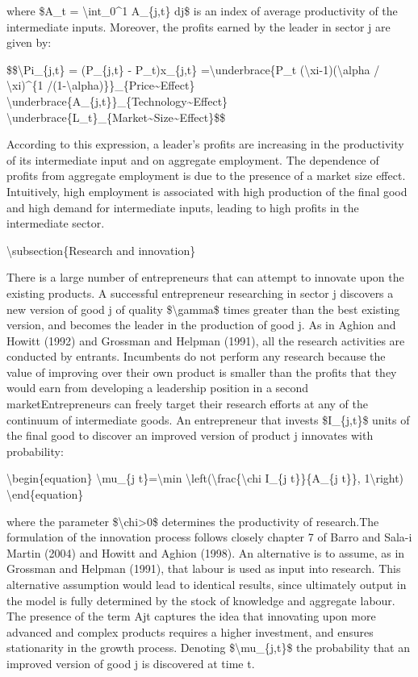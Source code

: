 \documentclass[10pt,math=newtx,citestyle=gb7714-2015,bibstyle=gb7714-2015]{elegantbook}
\begin{document}
	where \$A\_t = \textbackslash{}int\_0\^{}1 A\_\{j,t\} dj\$ is an index of average productivity of the intermediate inputs. Moreover, the profits earned by the leader in sector j are given by:
	
	\$\$\textbackslash{}Pi\_\{j,t\} = (P\_\{j,t\} - P\_t)x\_\{j,t\} =\textbackslash{}underbrace\{P\_t (\textbackslash{}xi-1)(\textbackslash{}alpha / \textbackslash{}xi)\^{}\{1 /(1-\textbackslash{}alpha)\}\}\_\{Price\~{}Effect\} \textbackslash{}underbrace\{A\_\{j,t\}\}\_\{Technology\~{}Effect\} \textbackslash{}underbrace\{L\_t\}\_\{Market\~{}Size\~{}Effect\}\$\$
	
	According to this expression, a leader’s profits are increasing in the productivity of its intermediate input and on aggregate employment. The dependence of profits from aggregate employment is due to the presence of a market size effect. Intuitively, high employment is associated with high production of the final good and high demand for intermediate inputs, leading to high profits in the intermediate sector.
	
	\textbackslash{}subsection\{Research and innovation\}
	
	There is a large number of entrepreneurs that can attempt to innovate upon the existing products. A successful entrepreneur researching in sector j discovers a new version of good j of quality \$\textbackslash{}gamma\$ times greater than the best existing version, and becomes the leader in the production of good j. As in Aghion and Howitt (1992) and Grossman and Helpman (1991), all the research activities are conducted by entrants. Incumbents do not perform any research because the value of improving over their own product is smaller than the profits that they would earn from developing a leadership position in a second marketEntrepreneurs can freely target their research efforts at any of the continuum of intermediate goods. An entrepreneur that invests \$I\_\{j,t\}\$ units of the final good to discover an improved version of product j innovates with probability:
	
	\textbackslash{}begin\{equation\}
	\textbackslash{}mu\_\{j t\}=\textbackslash{}min \textbackslash{}left(\textbackslash{}frac\{\textbackslash{}chi I\_\{j t\}\}\{A\_\{j t\}\}, 1\textbackslash{}right)
	\textbackslash{}end\{equation\}
	
	where the parameter \$\textbackslash{}chi>0\$ determines the productivity of research.The formulation of the innovation process follows closely chapter 7 of Barro and Sala-i Martin (2004) and Howitt and Aghion (1998). An alternative is to assume, as in Grossman and Helpman (1991), that labour is used as input into research. This alternative assumption would lead to identical results, since ultimately output in the model is fully determined by the stock of knowledge and aggregate labour. The presence of the term Ajt captures the idea that innovating upon more advanced and complex products requires a higher investment, and ensures stationarity in the growth process. Denoting \$\textbackslash{}mu\_\{j,t\}\$ the probability that an improved version of good j is discovered at time t. 
	
\end{document}
